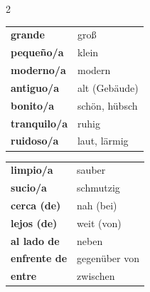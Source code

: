 \documentclass[11pt, a4paper]{article}
\begin{document}
\begin{tcolorbox}[
    colback=gruppeA!10,
    colframe=gruppeA,
    title={\color{white}\bfseries Descripciones -- Beschreibungen},
    fonttitle=\bfseries
]

\begin{multicols}{2}
\begin{tabular}{@{}p{5cm}p{4cm}@{}}
\textbf{grande} & groß \\
\textbf{pequeño/a} & klein \\
\textbf{moderno/a} & modern \\
\textbf{antiguo/a} & alt (Gebäude) \\
\textbf{bonito/a} & schön, hübsch \\
\textbf{tranquilo/a} & ruhig \\
\textbf{ruidoso/a} & laut, lärmig \\
\end{tabular}

\columnbreak

\begin{tabular}{@{}p{5cm}p{4cm}@{}}
\textbf{limpio/a} & sauber \\
\textbf{sucio/a} & schmutzig \\
\textbf{cerca (de)} & nah (bei) \\
\textbf{lejos (de)} & weit (von) \\
\textbf{al lado de} & neben \\
\textbf{enfrente de} & gegenüber von \\
\textbf{entre} & zwischen \\
\end{tabular}
\end{multicols}

\end{tcolorbox}

\vspace{0.3cm}

\end{document}
